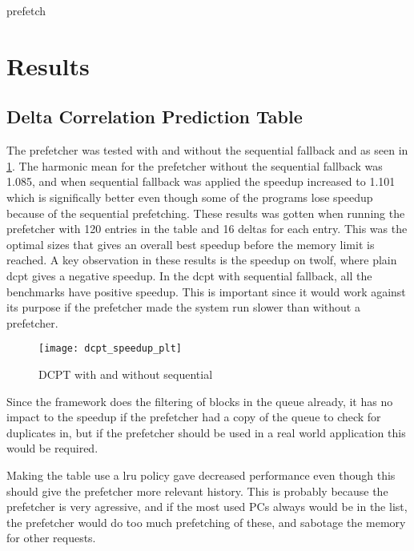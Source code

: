 \documentclass[12pt,journal,compsoc]{IEEEtran}
\begin{document}
\begin{algorithm}
\dontprintsemicolon
{}

\caption{prefetch\label{pre}}
\end{algorithm}

\section{Results}
\subsection{Delta Correlation Prediction Table}
The prefetcher was tested with and without the sequential fallback and as seen in \ref{fig:dcptspeed}. The harmonic mean for the prefetcher without the sequential fallback was 1.085, and when sequential fallback was applied the speedup increased to 1.101 which is significally better even though some of the programs lose speedup because of the sequential prefetching. These results was gotten when running the prefetcher with 120 entries in the table and 16 deltas for each entry. This was the optimal sizes that gives an overall best speedup before the memory limit is reached.
A key observation in these results is the speedup on twolf, where plain dcpt gives a negative speedup. In the dcpt with sequential fallback, all the benchmarks have positive speedup. This is important since it would work against its purpose if the prefetcher made the system run slower than without a prefetcher.

\begin{figure}
\begin{center}
\texttt{[image: dcpt\_speedup\_plt]}
\end{center}
\caption{\label{fig:dcptspeed} DCPT with and without sequential}
\end{figure}

Since the framework does the filtering of blocks in the queue already, it has no impact to the speedup if the prefetcher had a copy of the queue to check for duplicates in, but if the prefetcher should be used in a real world application this would be required.

Making the table use a lru policy gave decreased performance even though this should give the prefetcher more relevant history. This is probably because the prefetcher is very agressive, and if the most used PCs always would be in the list, the prefetcher would do too much prefetching of these, and sabotage the memory for other requests.
\end{document}
